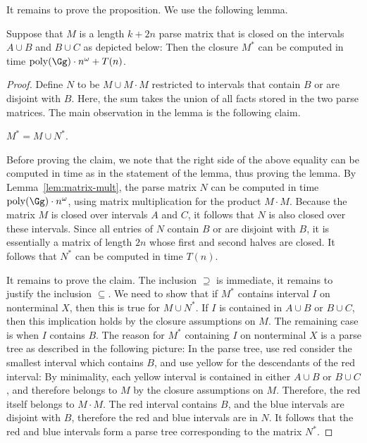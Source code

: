 It remains to prove the proposition. We use the following lemma.



\begin{lemma}\label{lem:overlap}
Suppose that $M$ is a length $k+2n$ parse matrix that is closed on the intervals $A \cup B$ and $B \cup C$ as depicted below: 
Then the closure $M^*$  can be computed in time 
 $ \mathrm{poly}(\Gg)  \cdot n^\omega + T(n)$.
\end{lemma}
\begin{proof}  
Define $N$ to be $M \cup M \cdot M$ restricted to intervals that contain $B$ or are disjoint with $B$. Here, the sum takes the union of all facts stored in the two parse matrices.    The main observation in the lemma is
the following claim.
\begin{claim}
	$M^* = M \cup N^*$.
\end{claim}

Before proving the claim, we note that the right side of the above equality can be computed in time as in the statement of the lemma, thus proving the lemma.   By Lemma~\ref{lem:matrix-mult}, the parse matrix $N$ can be computed in time $\mathrm{poly}(\Gg)  \cdot n^\omega$, using matrix multiplication for the product $M \cdot M$. Because the matrix $M$ is closed over intervals $A$ and $C$, it follows that $N$ is also closed over these intervals. Since all entries of $N$ contain $B$ or are disjoint with $B$, it is essentially a matrix of length $2n$ whose first and second halves are closed. It follows that $N^*$ can be computed in time $T(n)$. 


It remains to prove the claim. The inclusion $\supseteq$ is immediate, it remains to justify the inclusion $\subseteq$.  
We need to show that if $M^*$ contains interval $I$ on nonterminal $X$, then this is true for $M \cup N^*$. If $I$ is contained in $A \cup B$ or $B \cup C$, then this implication holds by  the closure assumptions on $M$. The remaining case is when $I$ contains $B$. The reason for $M^*$ containing $I$ on nonterminal $X$  is  a parse tree as described in the following picture:
In the parse tree, use red consider the smallest interval which contains $B$, and use yellow for the descendants of the red interval:
By minimality, each yellow interval is contained in either  $A \cup B$ or  $B \cup C$, and therefore belongs to  $M$ by the closure assumptions on $M$.  Therefore, the red itself belongs to $M \cdot M$. The red interval contains $B$, and the blue intervals are disjoint with $B$, therefore the red and blue intervals are in $N$. It follows that the red and blue intervals form a parse tree corresponding  to the matrix  $N^*$. 
\end{proof}


